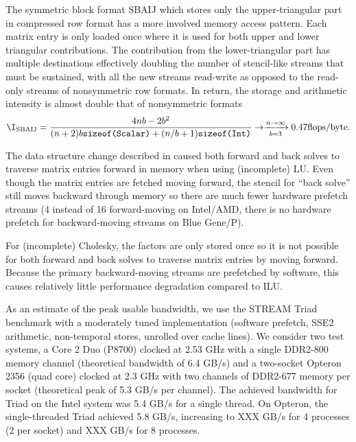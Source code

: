 The symmetric block format SBAIJ which stores only the upper-triangular part in compressed row format has a more involved memory access pattern.
Each matrix entry is only loaded once where it is used for both upper and lower triangular contributions.
The contribution from the lower-triangular part has multiple destinations effectively doubling the number of stencil-like streams that must be sustained, with all the new streams read-write as opposed to the read-only streams of nonsymmetric row formats.
In return, the storage and arithmetic intensity is almost double that of nonsymmetric formats
\begin{align*}
  \I_{\text{SBAIJ}} = \frac{4nb - 2b^2}{(n+2)b\texttt{sizeof(Scalar)} + (n/b+1)\texttt{sizeof(Int)}} \to \xrightarrow[b=3]{n\to\infty} 0.47 \text{flops/byte} .
\end{align*}

The data structure change described in \cite{smith2010sparse} caused both forward and back solves to traverse matrix entries forward in memory when using (incomplete) LU.
Even though the matrix entries are fetched moving forward, the stencil for ``back solve'' still moves backward through memory so there are much fewer hardware prefetch streams (4 instead of 16 forward-moving on Intel/AMD, there is no hardware prefetch for backward-moving streams on Blue Gene/P).

For (incomplete) Cholesky, the factors are only stored once so it is not possible for both forward and back solves to traverse matrix entries by moving forward.
Because the primary backward-moving streams are prefetched by software, this causes relatively little performance degradation compared to ILU.


As an estimate of the peak usable bandwidth, we use the STREAM Triad benchmark with a moderately tuned implementation (software prefetch, SSE2 arithmetic, non-temporal stores, unrolled over cache lines).
We consider two test systems, a Core 2 Duo (P8700) clocked at 2.53 GHz with a single DDR2-800 memory channel (theoretical bandwidth of 6.4 GB/s) and a two-socket Opteron 2356 (quad core) clocked at 2.3 GHz with two channels of DDR2-677 memory per socket (theoretical peak of 5.3 GB/s per channel).
The achieved bandwidth for Triad on the Intel system was 5.4 GB/s for a single thread.
On Opteron, the single-threaded Triad achieved 5.8 GB/s, increasing to XXX GB/s for 4 processes (2 per socket) and XXX GB/s for 8 processes.

